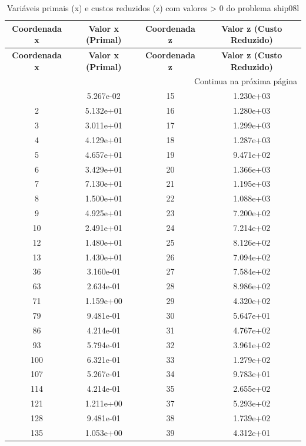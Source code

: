 \documentclass[12pt]{article}
\begin{document}
\begin{longtable}{@{}cccc@{}}
\caption{Variáveis primais (x) e custos reduzidos (z) com valores > 0 do problema ship08l} \\
\toprule
\textbf{Coordenada x} & \textbf{Valor x (Primal)} & \textbf{Coordenada z} & \textbf{Valor z (Custo Reduzido)} \\
\midrule
\endfirsthead

\toprule
\textbf{Coordenada x} & \textbf{Valor x (Primal)} & \textbf{Coordenada z} & \textbf{Valor z (Custo Reduzido)} \\
\midrule
\endhead

\midrule \multicolumn{4}{r}{{Continua na próxima página}} \\ \midrule
\endfoot

\bottomrule
\endlastfoot
1 & 5.267e-02 & 15 & 1.230e+03 \\
2 & 5.132e+01 & 16 & 1.280e+03 \\
3 & 3.011e+01 & 17 & 1.299e+03 \\
4 & 4.129e+01 & 18 & 1.287e+03 \\
5 & 4.657e+01 & 19 & 9.471e+02 \\
6 & 3.429e+01 & 20 & 1.366e+03 \\
7 & 7.130e+01 & 21 & 1.195e+03 \\
8 & 1.500e+01 & 22 & 1.088e+03 \\
9 & 4.925e+01 & 23 & 7.200e+02 \\
10 & 2.491e+01 & 24 & 7.214e+02 \\
12 & 1.480e+01 & 25 & 8.126e+02 \\
13 & 1.430e+01 & 26 & 7.094e+02 \\
36 & 3.160e-01 & 27 & 7.584e+02 \\
63 & 2.634e-01 & 28 & 8.986e+02 \\
71 & 1.159e+00 & 29 & 4.320e+02 \\
79 & 9.481e-01 & 30 & 5.647e+01 \\
86 & 4.214e-01 & 31 & 4.767e+02 \\
93 & 5.794e-01 & 32 & 3.961e+02 \\
100 & 6.321e-01 & 33 & 1.279e+02 \\
107 & 5.267e-01 & 34 & 9.783e+01 \\
114 & 4.214e-01 & 35 & 2.655e+02 \\
121 & 1.211e+00 & 37 & 5.293e+02 \\
128 & 9.481e-01 & 38 & 1.739e+02 \\
135 & 1.053e+00 & 39 & 4.312e+01 \\

\end{longtable}
\end{document}
